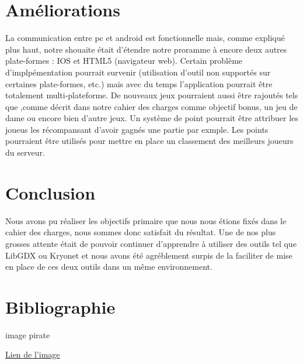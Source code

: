\documentclass{report}
\begin{document}
\chapter{Améliorations}
La communication entre pc et android est fonctionnelle mais, comme expliqué plus haut, notre shouaite était d'étendre notre proramme à encore deux autres
plate-formes : IOS et HTML5 (navigateur web). Certain problème d'implpémentation pourrait survenir (utilisation d'outil non supportés sur certaines plate-formes, etc.)
mais avec du temps l'application pourrait être totalement multi-plateforme.
De nouveaux jeux pourraient aussi être rajoutés tels que ,comme décrit dans notre cahier des charges comme objectif bonus,
un jeu de dame ou encore bien d'autre jeux. Un système de point pourrait être attribuer les joueus les récompansant d'avoir gagnés une
partie par exmple. Les points pourraient être utilisés pour mettre en place un classement des meilleurs joueurs du serveur.

\chapter{Conclusion}
Nous avons pu réaliser les objectifs primaire que nous nous étions fixés dans le cahier des charges, nous
sommes donc satisfait du résultat. Une de nos plus grosses attente était de pouvoir continuer d'apprendre à
utiliser des outils tel que LibGDX ou Kryonet et nous avons été agréblement surpis de la faciliter de mise
en place de ces deux outils dans un même environnement.

\chapter{Bibliographie}

image pirate

\href{http://www.flaticon.com/free-icon/pirate-ship_361245#term=pirate%20ship&page=1&position=6}{Lien de l'image}
\end{document}
